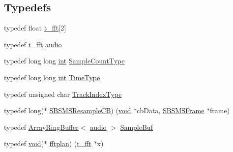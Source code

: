 \subsection*{Typedefs}
\begin{DoxyCompactItemize}
\item 
typedef float \hyperlink{namespace__sbsms___af5c6f976b2da21c36853e3b0c5995a54}{t\+\_\+fft}\mbox{[}2\mbox{]}
\item 
typedef \hyperlink{namespace__sbsms___af5c6f976b2da21c36853e3b0c5995a54}{t\+\_\+fft} \hyperlink{namespace__sbsms___a11786cc5bd221ff534972ae350477324}{audio}
\item 
typedef long long \hyperlink{xmltok_8h_a5a0d4a5641ce434f1d23533f2b2e6653}{int} \hyperlink{namespace__sbsms___ae4ba47977e7e07f5945e529e2256b662}{Sample\+Count\+Type}
\item 
typedef long long \hyperlink{xmltok_8h_a5a0d4a5641ce434f1d23533f2b2e6653}{int} \hyperlink{namespace__sbsms___a3a161c3deff71e932c0ec86aad54eb7c}{Time\+Type}
\item 
typedef unsigned char \hyperlink{namespace__sbsms___a92908dbd644f9cd709ffe3608e9e4510}{Track\+Index\+Type}
\item 
typedef long($\ast$ \hyperlink{namespace__sbsms___a1b88e19baa604934b1c3cdec1fae8d4b}{S\+B\+S\+M\+S\+Resample\+CB}) (\hyperlink{sound_8c_ae35f5844602719cf66324f4de2a658b3}{void} $\ast$cb\+Data, \hyperlink{struct__sbsms___1_1_s_b_s_m_s_frame}{S\+B\+S\+M\+S\+Frame} $\ast$frame)
\item 
typedef \hyperlink{class__sbsms___1_1_array_ring_buffer}{Array\+Ring\+Buffer}$<$ \hyperlink{namespace__sbsms___a11786cc5bd221ff534972ae350477324}{audio} $>$ \hyperlink{namespace__sbsms___a8cd0992a16c2cc5448b63d446239c196}{Sample\+Buf}
\item 
typedef \hyperlink{sound_8c_ae35f5844602719cf66324f4de2a658b3}{void}($\ast$ \hyperlink{namespace__sbsms___a7f1d3311b2efc8799b5c4bf22942e197}{fftplan}) (\hyperlink{namespace__sbsms___af5c6f976b2da21c36853e3b0c5995a54}{t\+\_\+fft} $\ast$x)
\end{DoxyCompactItemize}
